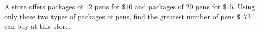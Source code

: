 A store offers packages of $12$ pens for $\$10$ and packages of $20$ pens for $\$15$. Using only these two types of packages of pens, find the greatest number of pens $\$173$ can buy at this store.

